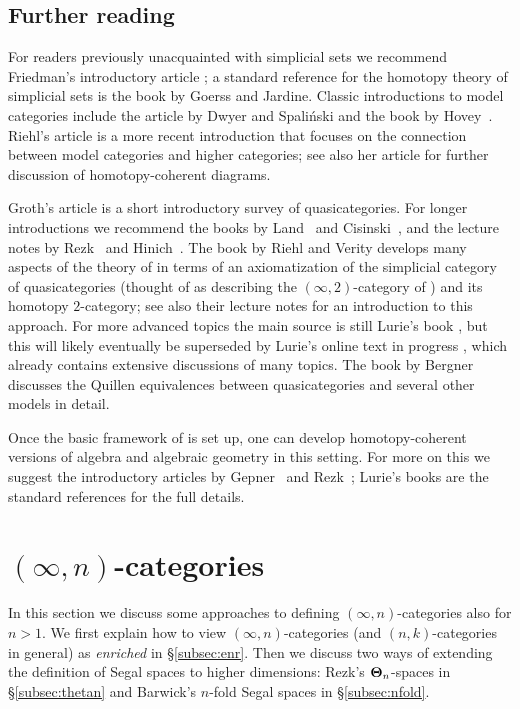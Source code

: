 \documentclass[a4paper,11pt]{article}
\begin{document}
\subsection{Further reading}
For readers previously unacquainted with simplicial sets we recommend
Friedman's introductory article \cite{Friedman}; a standard reference
for the homotopy theory of simplicial sets is the book
\cite{GoerssJardine} by Goerss and Jardine. Classic introductions to model categories include the article
\cite{DwyerSpa} by Dwyer and Spali\'nski and the book by
Hovey~\cite{Hovey}. Riehl's article \cite{RiehlHtC} is a more recent
introduction that focuses on the connection between model categories
and higher categories; see also her article \cite{RiehlCoh} for
further discussion of homotopy-coherent diagrams.

Groth's article \cite{Groth} is a short introductory survey of
quasicategories. For longer introductions we recommend the books by
Land~\cite{LandBook} and Cisinski~\cite{CisinskiBook}, and the lecture
notes by Rezk~\cite{RezkNotes} and Hinich~\cite{HinichNotes}. The book
by Riehl and Verity \cite{RiehlVerity} develops many aspects of the
theory of \icats{} in terms of an axiomatization of the simplicial
category of quasicategories (thought of as describing the
$(\infty,2)$-category of \icats{}) and its homotopy $2$-category; see
also their lecture notes \cite{RiehlVerityNotes} for an introduction
to this approach.  For more advanced topics the main source is still
Lurie's book \cite{HTT}, but this will likely eventually be superseded
by Lurie's online text in progress \cite{Kerodon}, which already
contains extensive discussions of many topics. The book \cite{Bergner}
by Bergner discusses the Quillen equivalences between quasicategories
and several other models in detail.

Once the basic framework of \icats{} is set up, one can develop
homotopy-coherent versions of algebra and algebraic geometry in this
setting. For more on this we suggest the introductory articles by
Gepner~\cite{GepnerIntro} and Rezk~\cite{RezkSAG}; Lurie's books
\cite{HA,SAG} are the standard references for the full details.


\section{$(\infty,n)$-categories}\label{sec:incats}
In this section we discuss some approaches to defining
$(\infty,n)$-categories also for $n > 1$. We first explain how to view
$(\infty,n)$-categories (and $(n,k)$-categories in general) as
\emph{enriched} \icats{} in \S\ref{subsec:enr}. Then we discuss two ways of
extending the definition of Segal spaces to higher dimensions: Rezk's
$\boldsymbol{\Theta}_{n}$-spaces in \S\ref{subsec:thetan} and Barwick's $n$-fold Segal
spaces in \S\ref{subsec:nfold}. 
\end{document}
